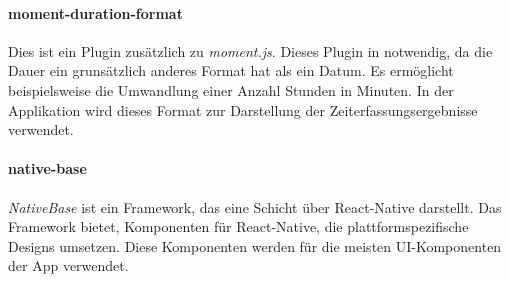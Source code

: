 \paragraph{moment-duration-format}
Dies ist ein Plugin zusätzlich zu \textit{moment.js}. Dieses Plugin in notwendig, da die Dauer ein
grunsätzlich anderes Format hat als ein Datum. Es ermöglicht beispielsweise die Umwandlung einer Anzahl Stunden in Minuten.
In der Applikation wird dieses Format zur Darstellung der Zeiterfassungsergebnisse verwendet. \cite{MomentDuration:online}

\paragraph{native-base}
\textit{NativeBase} ist ein Framework, das eine Schicht über React-Native darstellt. Das Framework bietet,
Komponenten für React-Native, die plattformspezifische Designs umsetzen. Diese Komponenten werden für die meisten UI-Komponenten der App
verwendet. \cite{NativeBase:online}